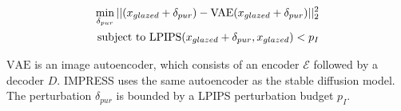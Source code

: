 \begin{align}
    \min_{\delta_{pur}} ||(x_{glazed} + \delta_{pur}) - \text{VAE}(x_{glazed} + \delta_{pur}) ||_2^2 \\
    \text{subject to } \text{LPIPS}(x_{glazed} + \delta_{pur}, x_{glazed}) < p_{I} \notag
\end{align}

\noindent $\text{VAE}$ is an image autoencoder, which consists of an encoder $\mathcal{E}$ followed by a decoder $D$. IMPRESS uses the same
autoencoder as the stable diffusion model. The 
perturbation $\delta_{pur}$ is bounded by a LPIPS 
perturbation budget $p_{I}$. 
